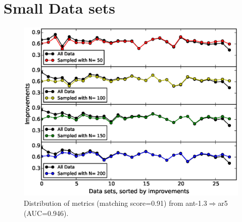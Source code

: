 \section{Small Data sets}
\label{sec: small_data_sets}
\begin{figure}[!t]
	\centering
	\vspace{0.5mm}
	\includegraphics[width=4.5in]{Figures/raleigh/sampled.eps}
	\caption{Distribution of metrics (matching score=0.91)
	from ant-1.3$\Rightarrow$ar5 (AUC=0.946).}
	\label{fig:best_dist}
\end{figure}

